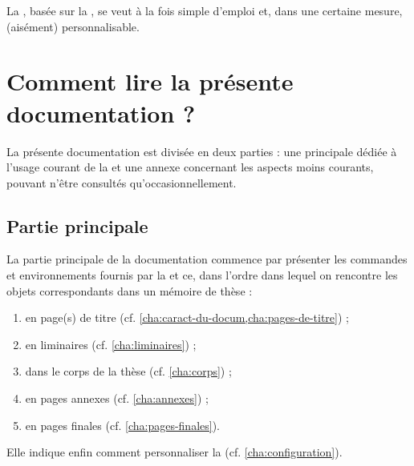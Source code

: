 La \yatcl{}, basée sur la , se veut à la fois simple d'emploi et,
dans une certaine mesure, (aisément) personnalisable.


\section{Comment lire la présente documentation ?}
\label{sec:comment-lire-cette}

La présente documentation est divisée en deux parties : une principale dédiée
à l'usage courant de la \yatcl{} et une annexe concernant les aspects moins
courants, pouvant n'être consultés qu'occasionnellement.

\subsection{Partie principale}
\label{sec:partie-principale}

La partie principale de la documentation commence par présenter les commandes et
environnements fournis par la \yatcl{} et ce, dans l'ordre dans lequel on
rencontre les objets correspondants dans un mémoire de thèse :
\begin{enumerate}
\item en page(s) de titre (cf. \vref{cha:caract-du-docum,cha:pages-de-titre}) ;
\item en \glspl{liminaire} (cf. \vref{cha:liminaires}) ;
\item dans le corps de la thèse (cf. \vref{cha:corps}) ;
\item en pages annexes (cf. \vref{cha:annexes}) ;
\item en pages finales (cf. \vref{cha:pages-finales}).
\end{enumerate}
Elle indique enfin comment personnaliser la \yatcl{}
(cf. \vref{cha:configuration}).

